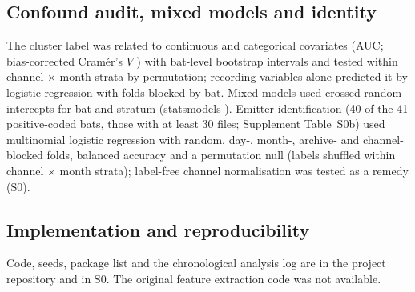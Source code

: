 \subsection{Confound audit, mixed models and identity}
The cluster label was related to continuous and categorical covariates (AUC; bias-corrected Cram\'er's $V$ \cite{bergsma2013}) with bat-level bootstrap intervals and tested within channel $\times$ month strata by permutation; recording variables alone predicted it by logistic regression with folds blocked by bat. Mixed models used crossed random intercepts for bat and stratum (statsmodels \cite{seabold2010}). Emitter identification (40 of the 41 positive-coded bats, those with at least 30 files; Supplement Table~S0b) used multinomial logistic regression with random, day-, month-, archive- and channel-blocked folds, balanced accuracy and a permutation null (labels shuffled within channel $\times$ month strata); label-free channel normalisation was tested as a remedy (S0).

\subsection{Implementation and reproducibility}
Code, seeds, package list and the chronological analysis log are in the project repository and in S0. The original feature extraction code was not available.
